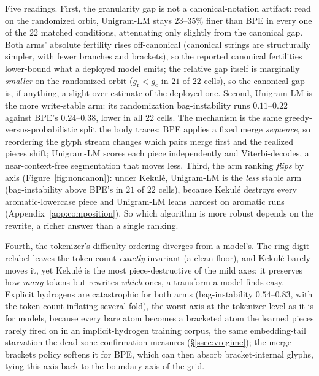 \documentclass{article}
\begin{document}
Five readings. First, the granularity gap is not a canonical-notation artifact:
read on the randomized orbit, Unigram-LM stays $23$--$35\%$ finer than BPE in
every one of the $22$ matched conditions, attenuating only slightly from the
canonical gap. Both arms' absolute fertility rises off-canonical (canonical
strings are structurally simpler, with fewer branches and brackets), so the
reported canonical fertilities lower-bound what a deployed model emits; the
relative gap itself is marginally \emph{smaller} on the randomized orbit
($g_{\mathrm{r}} < g_{\mathrm{c}}$ in $21$ of $22$ cells), so the canonical
gap is, if anything, a slight over-estimate of the deployed one. Second,
Unigram-LM is the more write-stable arm: its randomization bag-instability runs
$0.11$--$0.22$ against BPE's $0.24$--$0.38$, lower in all $22$ cells. The
mechanism is the same greedy-versus-probabilistic split the body traces: BPE
applies a fixed merge \emph{sequence}, so reordering the glyph stream changes
which pairs merge first and the realized pieces shift; Unigram-LM scores each
piece independently and Viterbi-decodes, a near-context-free segmentation that
moves less. Third, the arm ranking \emph{flips} by axis (Figure~\ref{fig:noncanon}): under
Kekul\'e, Unigram-LM is the \emph{less} stable arm (bag-instability above BPE's in
$21$ of $22$ cells),
because Kekul\'e destroys every aromatic-lowercase piece and Unigram-LM leans
hardest on aromatic runs (Appendix~\ref{app:composition}). So which algorithm is more
robust depends on the rewrite, a richer answer than a single ranking.

Fourth, the tokenizer's difficulty ordering diverges from a model's. The
ring-digit relabel leaves the token count \emph{exactly} invariant (a clean
floor), and Kekul\'e barely moves it, yet Kekul\'e is the most piece-destructive of
the mild axes: it preserves how \emph{many} tokens but rewrites \emph{which}
ones, a transform a model finds easy. Explicit hydrogens are catastrophic for
both arms (bag-instability $0.54$--$0.83$, with the token count inflating
several-fold), the worst axis at the tokenizer level as it is for models, because
every bare atom becomes a bracketed atom the learned pieces rarely fired on in an
implicit-hydrogen training corpus, the same embedding-tail starvation the
dead-zone confirmation measures (\S\ref{ssec:vregime}); the merge-brackets
policy softens it for BPE, which can then absorb bracket-internal glyphs, tying
this axis back to the boundary axis of the grid.
\end{document}
